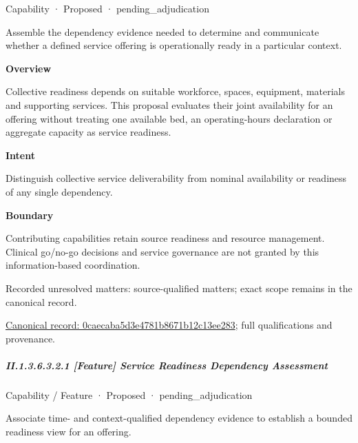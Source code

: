 \label{element:0caecaba5d3e4781b8671b12c13ee283}
{\small Capability · Proposed · pending\_adjudication}\par

Assemble the dependency evidence needed to determine and communicate whether a defined service offering is operationally ready in a particular context.



\textbf{Overview}



Collective readiness depends on suitable workforce, spaces, equipment, materials and supporting services. This proposal evaluates their joint availability for an offering without treating one available bed, an operating-hours declaration or aggregate capacity as service readiness.



\textbf{Intent}



Distinguish collective service deliverability from nominal availability or readiness of any single dependency.



\textbf{Boundary}



Contributing capabilities retain source readiness and resource management. Clinical go/no-go decisions and service governance are not granted by this information-based coordination.


{\small Recorded unresolved matters: source-qualified matters; exact scope remains in the canonical record.}\par
{\footnotesize \href{../../../../../../../continuum/strategy/capability/0caecaba5d3e4781b8671b12c13ee283.md}{Canonical record: 0caecaba5d3e4781b8671b12c13ee283}; full qualifications and provenance.}\par
\subparagraph*{II.1.3.6.3.2.1 [Feature] Service Readiness Dependency Assessment}
\label{navigation:II.1.3.6.3.2.1}

\label{element:4d917929d5cf43218049a84cf46662b0}
{\small Capability / Feature · Proposed · pending\_adjudication}\par

Associate time- and context-qualified dependency evidence to establish a bounded readiness view for an offering.



